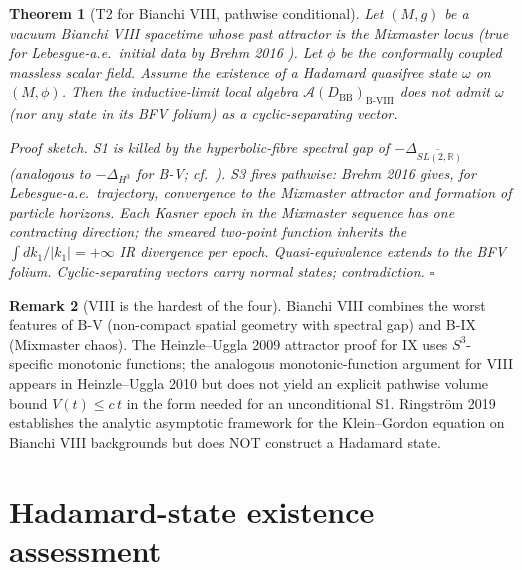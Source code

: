 \documentclass[11pt,a4paper]{article}
\newtheorem{theorem}{Theorem}
\theoremstyle{definition}
\newtheorem{remark}[theorem]{Remark}
\newcommand{\AAA}{\mathcal{A}}
\newcommand{\BVIII}{\mathrm{B\text{-}VIII}}
\newcommand{\BB}{\mathrm{BB}}
\newcommand{\R}{\mathbb{R}}
\begin{document}
\begin{theorem}[T2 for Bianchi VIII, pathwise conditional]\label{thm:BVIII}
Let $(M, g)$ be a vacuum Bianchi VIII spacetime whose past attractor is the
Mixmaster locus (true for Lebesgue-a.e.\ initial data by Brehm 2016
\cite{Brehm2016}). Let $\phi$ be the conformally coupled massless scalar
field. Assume the existence of a Hadamard quasifree state $\omega$ on $(M, \phi)$.
Then the inductive-limit local algebra $\AAA(D_\BB)_\BVIII$ does not admit
$\omega$ (nor any state in its BFV folium) as a cyclic-separating vector.

\noindent
\emph{Proof sketch.} S1 is killed by the hyperbolic-fibre spectral gap of
$-\Delta_{\widetilde{SL(2,\R)}}$ (analogous to $-\Delta_{H^3}$ for B-V; cf.\
\cite{T2BV}). S3 fires \emph{pathwise}: Brehm 2016 \cite{Brehm2016} gives,
for Lebesgue-a.e.\ trajectory, convergence to the Mixmaster attractor and
formation of particle horizons. Each Kasner epoch in the Mixmaster sequence
has one contracting direction; the smeared two-point function inherits the
$\int dk_1 / |k_1| = +\infty$ IR divergence per epoch. Quasi-equivalence
\cite{Verch1994,BFV2003} extends to the BFV folium. Cyclic-separating
vectors carry normal states; contradiction. $\square$
\end{theorem}

\begin{remark}[VIII is the hardest of the four]\label{rem:VIIIhard}
Bianchi VIII combines the worst features of B-V (non-compact spatial
geometry with spectral gap) and B-IX (Mixmaster chaos). The Heinzle--Uggla
2009 attractor proof \cite{HU2009a} for IX uses $S^3$-specific monotonic
functions; the analogous monotonic-function argument for VIII appears in
Heinzle--Uggla 2010 \cite{HU2010} but does not yield an explicit pathwise
volume bound $V(t) \le c\,t$ in the form needed for an unconditional S1.
Ringstr\"om 2019 \cite{Ringstrom2019} establishes the analytic asymptotic
framework for the Klein--Gordon equation on Bianchi VIII backgrounds but
does NOT construct a Hadamard state.
\end{remark}

\section{Hadamard-state existence assessment}\label{sec:hadamard}
\end{document}
